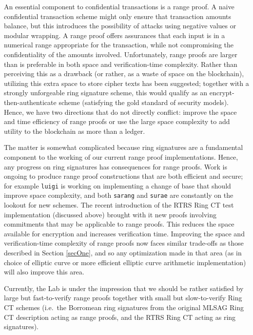 \documentclass[12pt,english]{mrl}
\theoremstyle{definition}
\numberwithin{equation}{section}
\numberwithin{figure}{section}
\numberwithin{equation}{section}
\numberwithin{equation}{section}
\numberwithin{figure}{section}
\begin{document}
An essential component to confidential transactions is a range proof. A naive confidential transaction scheme might only ensure that transaction amounts balance, but this introduces the possibility of attacks using negative values or modular wrapping. A range proof offers assurances that each input is in a numerical range appropriate for the transaction, while not compromising the confidentiality of the amounts involved. Unfortunately, range proofs are larger than is preferable in both space and verification-time complexity. Rather than perceiving this as a drawback (or rather, as a waste of space on the blockchain), utilizing this extra space to store cipher texts has been suggested; together with a strongly unforgeable ring signature scheme, this would qualify as an encrypt-then-authenticate scheme (satisfying the gold standard of security models). Hence, we have two directions that do not directly conflict: improve the space and time efficiency of range proofs or use the large space complexity to add utility to the blockchain as more than a ledger.

The matter is somewhat complicated because ring signatures are a fundamental component to the working of our current range proof implementations. Hence, any progress on ring signatures has consequences for range proofs. Work is ongoing to produce range proof constructions that are both efficient and secure; for example \texttt{luigi} is working on implementing a change of base that should improve space complexity, and both \texttt{sarang} and \texttt{surae} are constantly on the lookout for new schemes. The recent introduction of the RTRS Ring CT test implementation (discussed above) brought with it new proofs involving commitments that may be applicable to range proofs. This reduces the space available for encryption and increases verification time. Improving the space and verification-time complexity of range proofs now faces similar trade-offs as those described in Section \ref{secOne}, and so any optimization made in that area (as in choice of elliptic curve or more efficient elliptic curve arithmetic implementation) will also improve this area. 

Currently, the Lab is under the impression that we should be rather satisfied by large but fast-to-verify range proofs together with small but slow-to-verify Ring CT schemes (i.e.\ the Borromean ring signatures from the original MLSAG Ring CT description acting as range proofs, and the RTRS Ring CT acting as ring signatures). 
\end{document}
